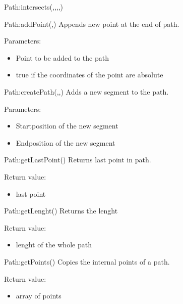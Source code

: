 \begin{luacommand}{{Path:\textunderscore{}intersects}(,,,,)}
\end{luacommand}\begin{luacommand}{{Path:addPoint}(,)}
Appends new point at the end of path.

Parameters:
\begin{itemize}
	\item[]  \subitem Point to be added to the path\item[]  \subitem true if the coordinates of the point are absolute
\end{itemize}



\end{luacommand}\begin{luacommand}{{Path:createPath}(,,)}
Adds a new segment to the path.

Parameters:
\begin{itemize}
	\item[]  \subitem Startposition of the new segment\item[]  \subitem Endposition of the new segment
\end{itemize}



\end{luacommand}\begin{luacommand}{{Path:getLastPoint}()}
Returns last point in path.


Return value:
\begin{itemize} \item[] last point \end{itemize}


\end{luacommand}\begin{luacommand}{{Path:getLenght}()}
Returns the lenght


Return value:
\begin{itemize} \item[] lenght of the whole path \end{itemize}


\end{luacommand}\begin{luacommand}{{Path:getPoints}()}
Copies the internal points of a path.


Return value:
\begin{itemize} \item[] array of points \end{itemize}



\end{luacommand}
